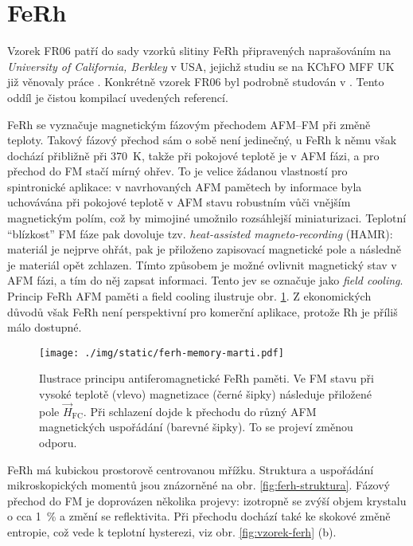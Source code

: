 \section{FeRh}
\label{chap:vzorek-ferh}

Vzorek FR06 patří do sady vzorků slitiny FeRh připravených naprašováním na \emph{University of California, Berkley} v USA, jejichž studiu se na KChFO MFF UK již věnovaly práce \cite{brajerLaserovaSpektroskopieMaterialu2015,saidlUltrarychlaLaserovaSpektroskopie2018,kubascikMagnetooptickeStudiumAntiferomagnetickych2019,saidlInvestigationMagnetostructuralPhase2016}.
Konkrétně vzorek FR06 byl podrobně studován v \cite{saidlUltrarychlaLaserovaSpektroskopie2018,kubascikMagnetooptickeStudiumAntiferomagnetickych2019}.
Tento oddíl je čistou kompilací uvedených referencí.

FeRh se vyznačuje magnetickým fázovým přechodem AFM--FM při změně teploty.
Takový fázový přechod sám o sobě není jedinečný, u FeRh k němu však dochází přibližně při \SI{370}{\kelvin}, takže při pokojové teplotě je v AFM fázi, a pro přechod do FM stačí mírný ohřev.
To je velice žádanou vlastností pro spintronické aplikace: v navrhovaných AFM pamětech by informace byla uchovávána při pokojové teplotě v AFM stavu robustním vůči vnějším magnetickým polím, což by mimojiné umožnilo rozsáhlejší miniaturizaci.
Teplotní ``blízkost'' FM fáze pak dovoluje tzv. \emph{heat-assisted magneto-recording} (HAMR): materiál je nejprve ohřát, pak je přiloženo zapisovací magnetické pole a následně je materiál opět zchlazen.
Tímto způsobem je možné ovlivnit magnetický stav v AFM fázi, a tím do něj zapsat informaci.
Tento jev se označuje jako \emph{field cooling}.
Princip FeRh AFM paměti a field cooling ilustruje obr. \ref{fig:ferh-memory}.
Z ekonomických důvodů však FeRh není perspektivní pro komerční aplikace, protože Rh je příliš málo dostupné.

\begin{figure}[htbp]
    \centering
    \texttt{[image: ./img/static/ferh-memory-marti.pdf]}
    \caption{Ilustrace principu antiferomagnetické FeRh paměti.
        Ve FM stavu při vysoké teplotě (vlevo) magnetizace (černé šipky) následuje přiložené pole $\vec{H}_\textrm{FC}$. 
        Při schlazení dojde k přechodu do různý AFM magnetických uspořádání (barevné šipky). To se projeví změnou odporu. \cite{martiRoomtemperatureAntiferromagneticMemory2014}}
    \label{fig:ferh-memory}
\end{figure}

FeRh má kubickou prostorově centrovanou mřížku.
Struktura a uspořádání mikroskopických momentů jsou znázorněné na obr. \ref{fig:ferh-struktura}.
Fázový přechod do FM je doprovázen několika projevy: izotropně se zvýší objem krystalu o cca \SI{1}{\percent} a změní se reflektivita\cite{saidlInvestigationMagnetostructuralPhase2016}.
Při přechodu dochází také ke skokové změně entropie, což vede k teplotní hysterezi, viz obr. \ref{fig:vzorek-ferh} (b).

